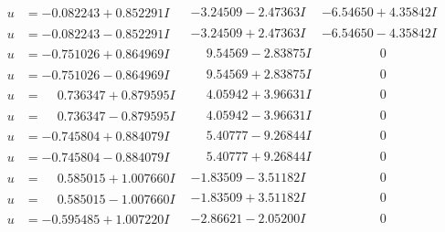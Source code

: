 \documentclass[1p]{elsarticle_modified}
\theoremstyle{definition}
\begin{document}
$$\begin{array}{c|c|c}
\begin{aligned}
u &= -0.082243 + 0.852291 I\end{aligned}
 & -3.24509 - 2.47363 I & -6.54650 + 4.35842 I \\ \hline\begin{aligned}
u &= -0.082243 - 0.852291 I\end{aligned}
 & -3.24509 + 2.47363 I & -6.54650 - 4.35842 I \\ \hline\begin{aligned}
u &= -0.751026 + 0.864969 I\end{aligned}
 & \phantom{-}9.54569 - 2.83875 I & \phantom{-0.000000 } 0 \\ \hline\begin{aligned}
u &= -0.751026 - 0.864969 I\end{aligned}
 & \phantom{-}9.54569 + 2.83875 I & \phantom{-0.000000 } 0 \\ \hline\begin{aligned}
u &= \phantom{-}0.736347 + 0.879595 I\end{aligned}
 & \phantom{-}4.05942 + 3.96631 I & \phantom{-0.000000 } 0 \\ \hline\begin{aligned}
u &= \phantom{-}0.736347 - 0.879595 I\end{aligned}
 & \phantom{-}4.05942 - 3.96631 I & \phantom{-0.000000 } 0 \\ \hline\begin{aligned}
u &= -0.745804 + 0.884079 I\end{aligned}
 & \phantom{-}5.40777 - 9.26844 I & \phantom{-0.000000 } 0 \\ \hline\begin{aligned}
u &= -0.745804 - 0.884079 I\end{aligned}
 & \phantom{-}5.40777 + 9.26844 I & \phantom{-0.000000 } 0 \\ \hline\begin{aligned}
u &= \phantom{-}0.585015 + 1.007660 I\end{aligned}
 & -1.83509 - 3.51182 I & \phantom{-0.000000 } 0 \\ \hline\begin{aligned}
u &= \phantom{-}0.585015 - 1.007660 I\end{aligned}
 & -1.83509 + 3.51182 I & \phantom{-0.000000 } 0 \\ \hline\begin{aligned}
u &= -0.595485 + 1.007220 I\end{aligned}
 & -2.86621 - 2.05200 I & \phantom{-0.000000 } 0 \\ \hline\begin{aligned}

\end{aligned}
\end{array}$$
\end{document}
